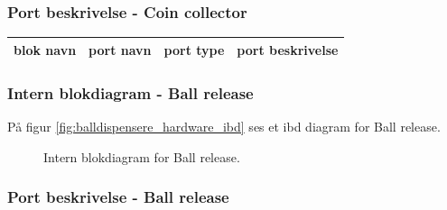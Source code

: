 \documentclass[Arkitektur/System_main.tex]{subfiles}
\begin{document}
\subsubsection{Port beskrivelse - Coin collector} \label{sec:coin_collector_hardware_ports}


\begin{table}[]
\begin{tabular}{|l|l|l|l|}
\hline
blok navn & port navn & port type & port beskrivelse \\ \hline
\end{tabular}
\end{table}


\subsubsection{Intern blokdiagram - Ball release} \label{sec:ball_release_hardware_ibd}

På figur \ref{fig:balldispensere_hardware_ibd} ses et ibd diagram for Ball release.

\begin{figure}[H]
    \centering
    \caption{Intern blokdiagram for Ball release.}
    \label{fig:ball_release_hardware_ibd}
\end{figure}

\subsubsection{Port beskrivelse - Ball release} \label{sec:ball_release_hardware_ports}
\end{document}
